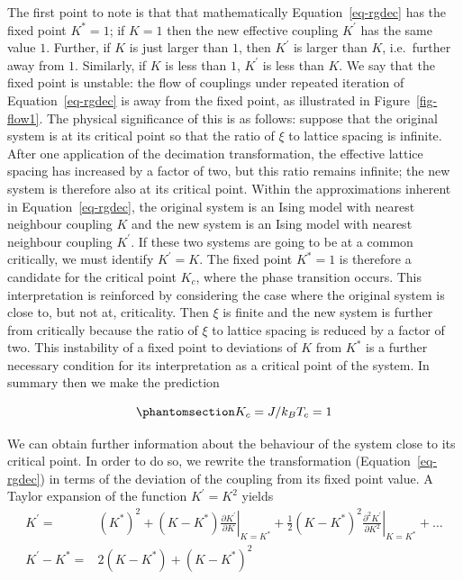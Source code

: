 \documentclass[
  letterpaper,
  enabledeprecatedfontcommands]{report}
\begin{document}
The first point to note is that that mathematically
Equation~\ref{eq-rgdec} has the fixed point \(K^*= 1\); if \(K= 1\) then
the new effective coupling \(K^\prime\) has the same value \(1\).
Further, if \(K\) is just larger than \(1\), then \(K^\prime\) is larger
than \(K\), i.e.~further away from \(1\). Similarly, if \(K\) is less
than \(1\), \(K^\prime\) is less than \(K\). We say that the fixed point
is unstable: the flow of couplings under repeated iteration of
Equation~\ref{eq-rgdec} is away from the fixed point, as illustrated in
Figure~\ref{fig-flow1}. The physical significance of this is as follows:
suppose that the original system is at its critical point so that the
ratio of \(\xi\) to lattice spacing is infinite. After one application
of the decimation transformation, the effective lattice spacing has
increased by a factor of two, but this ratio remains infinite; the new
system is therefore also at its critical point. Within the
approximations inherent in Equation~\ref{eq-rgdec}, the original system
is an Ising model with nearest neighbour coupling \(K\) and the new
system is an Ising model with nearest neighbour coupling \(K^\prime\).
If these two systems are going to be at a common critically, we must
identify \(K^\prime=
K\). The fixed point \(K^*= 1\) is therefore a candidate for the
critical point \(K_c\), where the phase transition occurs. This
interpretation is reinforced by considering the case where the original
system is close to, but not at, criticality. Then \(\xi\) is finite and
the new system is further from critically because the ratio of \(\xi\)
to lattice spacing is reduced by a factor of two. This instability of a
fixed point to deviations of \(K\) from \(K^*\) is a further necessary
condition for its interpretation as a critical point of the system. In
summary then we make the prediction

\begin{equation}\phantomsection\label{eq-Kc}{
K_c=J/k_BT_c=1
}\end{equation}

We can obtain further information about the behaviour of the system
close to its critical point. In order to do so, we rewrite the
transformation (Equation~\ref{eq-rgdec}) in terms of the deviation of
the coupling from its fixed point value. A Taylor expansion of the
function \(K^\prime=K^2\) yields \[
\begin{aligned}
K^\prime =& (K^*)^2 +(K-K^*)\left.\frac{\partial K^\prime}{\partial K}\right|_{K=K^*}+\frac{1}{2}(K-K^*)^2\left.\frac{\partial^2 K^\prime}{\partial K^2}\right|_{K=K^*}+\ldots\nonumber\\
K^\prime - K^* =& 2 (K - K^*)+ (K - K^*)^2 
\end{aligned}
\]
\end{document}
